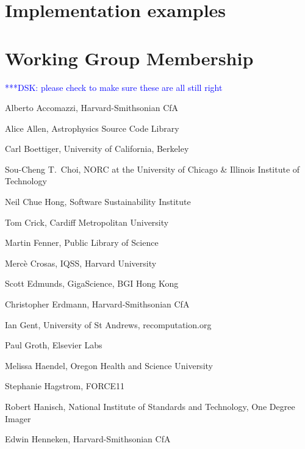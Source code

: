 \documentclass[11pt, oneside]{amsart}
\newcommand{\katznote}[1]{ {\textcolor{blue} { ***DSK: #1 }}} %
\newcommand{\dmnote}[1]{ {\textcolor{purple} { ***DM: #1 }}} %
\newcommand{\LJHnote}[1]{ {\textcolor{fuschsia} { ***LJH: #1 }}} %
\begin{document}

\section{Implementation examples}
\label{sec:examples}




\appendix

\section{Working Group Membership}
\label{app:wg_members}

\katznote{please check to make sure these are all still right}

Alberto Accomazzi, Harvard-Smithsonian CfA

Alice Allen, Astrophysics Source Code Library

Carl Boettiger, University of California,  Berkeley

Sou-Cheng T.~Choi, NORC at the University of Chicago \& Illinois Institute of Technology

Neil Chue Hong, Software Sustainability Institute

Tom Crick, Cardiff Metropolitan University

Martin Fenner, Public Library of Science

Merc\`e Crosas, IQSS, Harvard University

Scott Edmunds, GigaScience, BGI Hong Kong

Christopher Erdmann, Harvard-Smithsonian CfA

Ian Gent, University of St Andrews, recomputation.org

Paul Groth, Elsevier Labs

Melissa Haendel, Oregon Health and Science University

Stephanie Hagstrom, FORCE11

Robert Hanisch, National Institute of Standards and Technology, One Degree Imager

Edwin Henneken, Harvard-Smithsonian CfA
\end{document}

